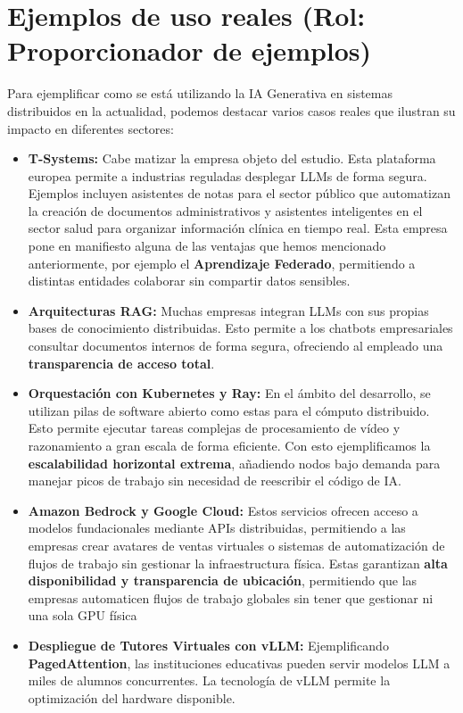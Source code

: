 \documentclass[runningheads]{llncs}
\begin{document}
\section{Ejemplos de uso reales (Rol: Proporcionador de ejemplos)}
Para ejemplificar como se está utilizando la IA Generativa en sistemas distribuidos en la actualidad, podemos destacar varios casos reales que ilustran su impacto en diferentes sectores:
\begin{itemize}
    \item \textbf{T-Systems:} Cabe matizar la empresa objeto del estudio.  Esta plataforma europea permite a industrias reguladas desplegar LLMs de forma segura. Ejemplos incluyen asistentes de notas para el sector público que automatizan la creación de documentos administrativos y asistentes inteligentes en el sector salud para organizar información clínica en tiempo real. \newline \newline Esta empresa pone en manifiesto alguna de las ventajas que hemos mencionado anteriormente, por ejemplo el \textbf{Aprendizaje Federado}, permitiendo a distintas entidades colaborar sin compartir datos sensibles.
    \newline
    \item \textbf{Arquitecturas RAG:} Muchas empresas integran LLMs con sus propias bases de conocimiento distribuidas. Esto permite a los chatbots empresariales consultar documentos internos de forma segura, ofreciendo al empleado una \textbf{transparencia de acceso total}.
    \newline
    \item \textbf{Orquestación con Kubernetes y Ray:} En el ámbito del desarrollo, se utilizan pilas de software abierto como estas para el cómputo distribuido. Esto permite ejecutar tareas complejas de procesamiento de vídeo y razonamiento a gran escala de forma eficiente. \newline \newline Con esto ejemplificamos la \textbf{escalabilidad horizontal extrema}, añadiendo nodos bajo demanda para manejar picos de trabajo sin necesidad de reescribir el código de IA.
    \newline
    \item \textbf{Amazon Bedrock y Google Cloud:}  Estos servicios ofrecen acceso a modelos fundacionales mediante APIs distribuidas, permitiendo a las empresas crear avatares de ventas virtuales o sistemas de automatización de flujos de trabajo sin gestionar la infraestructura física. \newline \newline Estas garantizan \textbf{alta disponibilidad y transparencia de ubicación}, permitiendo que las empresas automaticen flujos de trabajo globales sin tener que gestionar ni una sola GPU física
    \newline
    \item \textbf{Despliegue de Tutores Virtuales con vLLM:} Ejemplificando \textbf{PagedAttention}, las instituciones educativas pueden servir modelos LLM a miles de alumnos concurrentes. La tecnología de vLLM permite la optimización del hardware disponible.
\end{itemize}
\end{document}
